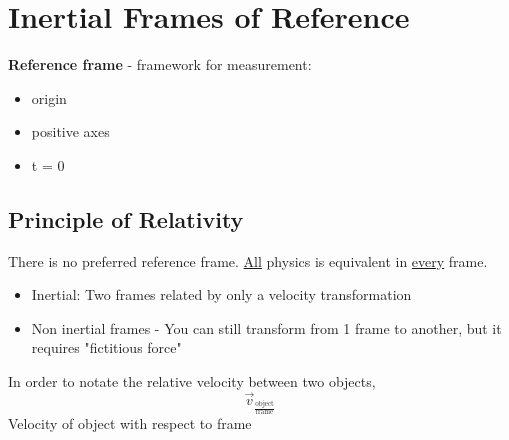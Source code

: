 \documentclass{article}
\begin{document}
\newcommand{\hr}{\par\noindent\rule{\textwidth}{0.4pt}}

\newcommand{\bc}[1]{
	\begin{equation*}
		\begin{boxed}
			{#1}
		\end{boxed}
	\end{equation*}
}

\newcommand{\cond}[2]{
	\ifmmode
		{#1} \quad {#2}
	\else
		$$ {#1} \quad {#2} $$
	\fi
}

\tableofcontents

\section{Inertial Frames of Reference}

\textbf{Reference frame} - framework for measurement:
\begin{itemize}
	\item origin
	\item positive axes
	\item t = 0
\end{itemize}

\subsection{Principle of Relativity}
There is no preferred reference frame. \underline{All} physics is equivalent in \underline{every} frame.

\begin{itemize}
	\item Inertial: Two frames related by only a velocity transformation
	\item Non inertial frames - You can still transform from 1 frame to another, but it requires "fictitious force"
\end{itemize}

In order to notate the relative velocity between two objects,
$$ \vec{v}_\frac{\text{object}}{\text{frame}} $$
Velocity of object with respect to frame
\end{document}
